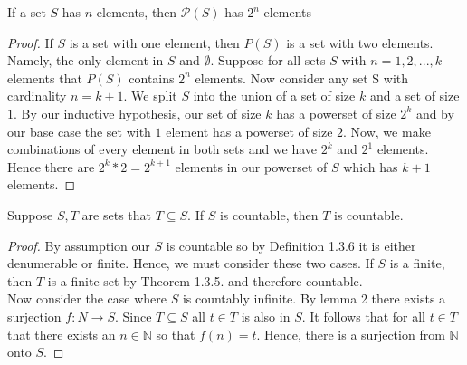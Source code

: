 \documentclass[12pt]{article}
\newcommand{\N}{\mathbb{N}}
\newenvironment{claim}[2][Claim]{\begin{trivlist}
		\item[\hskip \labelsep {\bfseries #1}\hskip \labelsep {\bfseries #2}]}{\end{trivlist}}
\begin{document}
	\begin{claim}{1.3.12}
		If a set $S$ has $n$ elements, then $\mathcal{P}(S)$ has $2^{n}$ elements
	\end{claim}
	\begin{proof}
		If $S$ is a set with one element, then $P(S)$ is a set with two elements. Namely, the only element in $S$ and $\emptyset$. Suppose for all sets $S$ with $n = 1, 2, ..., k$ elements that $P(S)$ contains $2 ^ n$ elements. Now consider any set S with cardinality $n = k + 1$. We split $S$ into the union of a set of size $k$ and a set of size $1$. By our inductive hypothesis, our set of size $k$ has a powerset of size $2^k$ and by our base case the set with $1$ element has a powerset of size $2$. Now, we make combinations of every element in both sets and we have $2^k$ and $ 2^1$ elements. Hence there are $2^k * 2 = 2^{k+1}$ elements in our powerset of $S$ which has $k+1$ elements.
	\end{proof}
	\begin{claim}{1.3.9a}
		Suppose $S, T$ are sets that $T \subseteq S$. If $S$ is countable, then $T$ is countable.
	\end{claim}
	\begin{proof}
		By assumption our $S$ is countable so by Definition 1.3.6 it is either denumerable or finite. Hence, we must consider these two cases. If $S$ is a finite, then $T$ is a finite set by Theorem 1.3.5. and therefore countable.\\
		Now consider the case where $S$ is countably infinite. By lemma 2 there exists a surjection $f: N \rightarrow S$. Since $T \subseteq S$ all $t \in T$ is also in $S$. It follows that for all $t \in T$ that there exists an $n \in \N$ so that $f(n) = t$. Hence, there is a surjection from $\N$ onto $S$.
	\end{proof}
\end{document}
